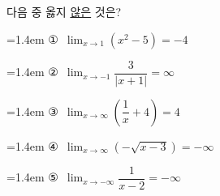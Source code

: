 다음 중 옳지 \underline{않은} 것은?
\par\medskip\par\noindent\hangindent=1.4em {\small ①}\ $\displaystyle\lim_{x\to 1}(x^2-5)=-4$\par\noindent\hangindent=1.4em {\small ②}\ $\displaystyle\lim_{x\to -1}\dfrac{3}{|x+1|}=\infty$\par\noindent\hangindent=1.4em {\small ③}\ $\displaystyle\lim_{x\to\infty}\left(\dfrac{1}{x}+4\right)=4$\par\noindent\hangindent=1.4em {\small ④}\ $\displaystyle\lim_{x\to\infty}(-\sqrt{x-3})=-\infty$\par\noindent\hangindent=1.4em {\small ⑤}\ $\displaystyle\lim_{x\to -\infty}\dfrac{1}{x-2}=-\infty$\par\medskip
